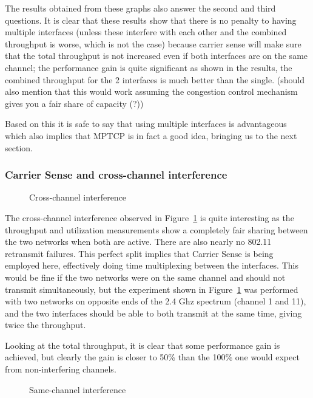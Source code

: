 \documentclass[12pt,a4paper]{article}
\begin{document}
The results obtained from these graphs also answer the second and third
questions. It is clear that these results show that there is no penalty to
having multiple interfaces (unless these interfere with each other and the
combined throughput is worse, which is not the case) because carrier sense will
make sure that the total throughput is not increased even if both interfaces are
on the same channel; the performance gain is quite significant as shown in the
results, the combined throughput for the 2 interfaces is much better than the
single. (should also mention that this would work assuming the congestion
control mechanism gives you a fair share of capacity (?))

Based on this it is safe to say that using multiple interfaces is advantageous
which also implies that MPTCP is in fact a good idea, bringing us to the next
section.

\subsubsection{Carrier Sense and cross-channel interference}
\begin{figure}[h]
 \centering
 
 \caption{Cross-channel interference}\label{graph:cc-interference}
\end{figure}

The cross-channel interference observed in Figure~\ref{graph:cc-interference} is
quite interesting as the throughput and utilization measurements show a
completely fair sharing between the two networks when both are active. There are
also nearly no 802.11 retransmit failures. This perfect split implies that
Carrier Sense is being employed here, effectively doing time multiplexing
between the interfaces.  This would be fine if the two networks were on the same
channel and should not transmit simultaneously, but the experiment shown in
Figure~\ref{graph:cc-interference} was performed with two networks on opposite
ends of the 2.4 Ghz spectrum (channel 1 and 11), and the two interfaces should
be able to both transmit at the same time, giving twice the throughput.

Looking at the total throughput, it is clear that some performance gain is
achieved, but clearly the gain is closer to 50\% than the 100\% one would expect
from non-interfering channels.

\begin{figure}[h]
 \centering
 
 \caption{Same-channel interference}\label{graph:sc-interference}
\end{figure}
\end{document}
